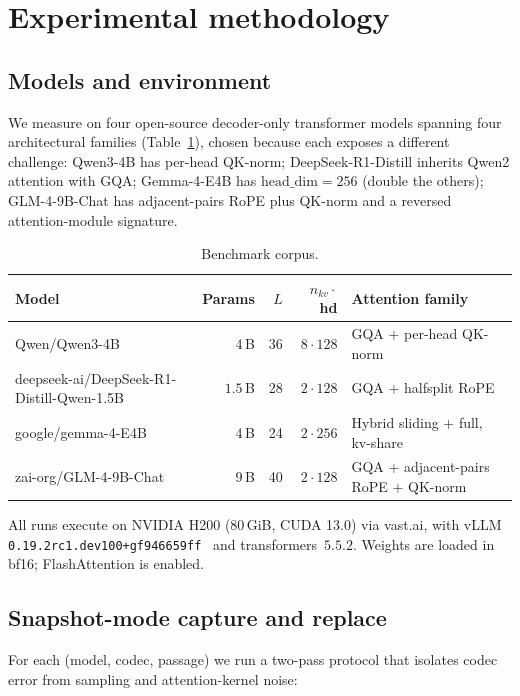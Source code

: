 \documentclass[11pt,a4paper]{article}
\theoremstyle{definition}
\theoremstyle{plain}
\begin{document}
\section{Experimental methodology}
\label{sec:methodology}

\subsection{Models and environment}

We measure on four open-source decoder-only transformer models
spanning four architectural families (Table~\ref{tab:models}),
chosen because each exposes a different challenge: Qwen3-4B has
per-head QK-norm; DeepSeek-R1-Distill inherits Qwen2 attention with
GQA; Gemma-4-E4B has $\text{head\_dim}=256$ (double the others);
GLM-4-9B-Chat has adjacent-pairs RoPE plus QK-norm and a reversed
attention-module signature.

\begin{table}[H]
\centering
\small
\caption{Benchmark corpus.}
\label{tab:models}
\begin{tabular}{lrrrl}
  \toprule
  Model & Params & $L$ & $n_{kv}\cdot$hd & Attention family \\
  \midrule
  Qwen/Qwen3-4B                             & $4\,$B   & 36 & $8\cdot128$ & GQA + per-head QK-norm \\
  deepseek-ai/DeepSeek-R1-Distill-Qwen-1.5B & $1.5\,$B & 28 & $2\cdot128$ & GQA + halfsplit RoPE \\
  google/gemma-4-E4B                        & $4\,$B   & 24 & $2\cdot 256$ & Hybrid sliding + full, kv-share \\
  zai-org/GLM-4-9B-Chat                     & $9\,$B   & 40 & $2\cdot128$ & GQA + adjacent-pairs RoPE + QK-norm \\
  \bottomrule
\end{tabular}
\end{table}

All runs execute on NVIDIA H200 (80\,GiB, CUDA 13.0) via vast.ai,
with vLLM \texttt{0.19.2rc1.dev100+gf946659ff}~\cite{vllm} and
transformers~$5.5.2$. Weights are loaded in bf16; FlashAttention is
enabled.

\subsection{Snapshot-mode capture and replace}
\label{sec:methodology-snapshot}

For each (model, codec, passage) we run a two-pass protocol that
isolates codec error from sampling and attention-kernel noise:
\end{document}

